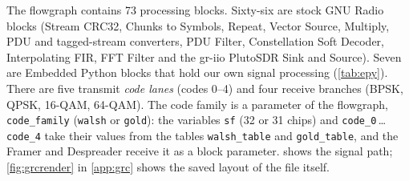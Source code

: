 \documentclass[11pt,a4paper,oneside]{report}
\newcommand{\code}[1]{\texttt{\small #1}}
\begin{document}
The flowgraph contains 73 processing blocks. Sixty-six are stock GNU Radio blocks (Stream CRC32,
Chunks to Symbols, Repeat, Vector Source, Multiply, PDU and tagged-stream converters, PDU Filter,
Constellation Soft Decoder, Interpolating FIR, FFT Filter and the gr-iio PlutoSDR Sink and Source).
Seven are Embedded Python blocks that hold our own signal processing (\cref{tab:epy}). There are five
transmit \emph{code lanes} (codes 0--4) and four receive branches (BPSK, QPSK, 16-QAM, 64-QAM). The
code family is a parameter of the flowgraph, \code{code\_family} (\code{walsh} or \code{gold}): the
variables \code{sf} (32 or 31 chips) and \code{code\_0}\,\ldots\,\code{code\_4} take their values from
the tables \code{walsh\_table} and \code{gold\_table}, and the Framer and Despreader receive it as a
block parameter.  shows the signal path; \cref{fig:grcrender} in \cref{app:grc} shows the
saved layout of the file itself.
\end{document}
